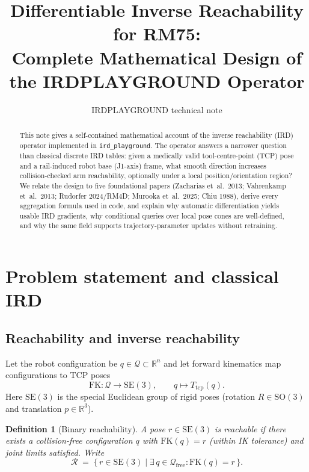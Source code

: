 \documentclass[11pt,a4paper]{article}
\title{Differentiable Inverse Reachability for RM75:\\
Complete Mathematical Design of the IRDPLAYGROUND Operator}
\author{IRDPLAYGROUND technical note}
\date{}
\newtheorem{definition}{Definition}
\newcommand{\SE}{\mathrm{SE}}
\newcommand{\SO}{\mathrm{SO}}
\newcommand{\R}{\mathbb{R}}
\newcommand{\Tcp}{T_{\mathrm{tcp}}}
\begin{document}
\maketitle

\begin{abstract}
This note gives a self-contained mathematical account of the inverse
reachability (IRD) operator implemented in \texttt{ird\_playground}.
The operator answers a narrower question than classical discrete IRD tables:
given a medically valid tool-centre-point (TCP) pose and a rail-induced robot
base (J1-axis) frame, what smooth direction increases collision-checked arm
reachability, optionally under a local position/orientation region?
We relate the design to five foundational papers
(Zacharias et~al.\ 2013; Vahrenkamp et~al.\ 2013; Rudorfer 2024/RM4D;
Murooka et~al.\ 2025; Chiu 1988),
derive every aggregation formula used in code, and explain why automatic
differentiation yields usable IRD gradients, why conditional queries over
local pose cones are well-defined, and why the same field supports
trajectory-parameter updates without retraining.
\end{abstract}

\tableofcontents
\newpage

\section{Problem statement and classical IRD}
\label{sec:problem}

\subsection{Reachability and inverse reachability}
\label{sec:classical}

Let the robot configuration be \(q\in\mathcal{Q}\subset\R^{n}\) and let
forward kinematics map configurations to TCP poses
\begin{equation}
\label{eq:fk}
  \mathrm{FK}:\mathcal{Q}\to\SE(3),\qquad
  q\mapsto \Tcp(q).
\end{equation}
Here \(\SE(3)\) is the special Euclidean group of rigid poses
(rotation \(R\in\SO(3)\) and translation \(p\in\R^{3}\)).

\begin{definition}[Binary reachability]
A pose \(r\in\SE(3)\) is \emph{reachable} if there exists a collision-free
configuration \(q\) with \(\mathrm{FK}(q)=r\) (within IK tolerance) and joint
limits satisfied. Write
\begin{equation}
\label{eq:binary-reach}
  \mathcal{R}
  \;=\;
  \bigl\{\, r\in\SE(3)
  \;\big|\;
  \exists\, q\in\mathcal{Q}_{\mathrm{free}}:
  \mathrm{FK}(q)=r
  \,\bigr\}.
\end{equation}
\end{definition}
\end{document}
